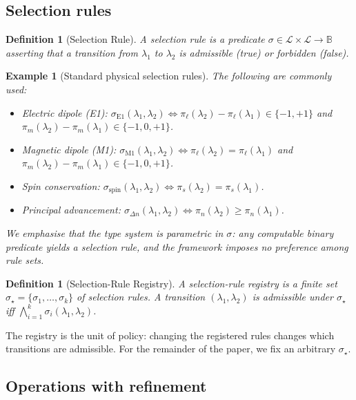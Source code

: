 \documentclass[twocolumn,11pt,a4paper]{article}
\newtheorem{definition}[theorem]{Definition}
\newtheorem{example}[theorem]{Example}
\newcommand{\Bool}{\mathbb{B}}
\newcommand{\Lab}{\mathcal{L}}
\newcommand{\Sel}{\sigma}
\begin{document}
\subsection{Selection rules}

\begin{definition}[Selection Rule]
\label{def:selection-rule}
A \emph{selection rule} is a predicate $\Sel \in \Lab \times \Lab \to \Bool$ asserting that a transition from $\lambda_1$ to $\lambda_2$ is admissible (true) or forbidden (false).
\end{definition}

\begin{example}[Standard physical selection rules]
\label{ex:physical-selection-rules}
The following are commonly used:
\begin{itemize}[nosep,leftmargin=*]
\item Electric dipole (E1): $\Sel_{\mathrm{E1}}(\lambda_1, \lambda_2) \iff \pi_\ell(\lambda_2) - \pi_\ell(\lambda_1) \in \{-1, +1\}$ and $\pi_m(\lambda_2) - \pi_m(\lambda_1) \in \{-1, 0, +1\}$.
\item Magnetic dipole (M1): $\Sel_{\mathrm{M1}}(\lambda_1, \lambda_2) \iff \pi_\ell(\lambda_2) = \pi_\ell(\lambda_1)$ and $\pi_m(\lambda_2) - \pi_m(\lambda_1) \in \{-1, 0, +1\}$.
\item Spin conservation: $\Sel_{\mathrm{spin}}(\lambda_1, \lambda_2) \iff \pi_s(\lambda_2) = \pi_s(\lambda_1)$.
\item Principal advancement: $\Sel_{\Delta n}(\lambda_1, \lambda_2) \iff \pi_n(\lambda_2) \geq \pi_n(\lambda_1)$.
\end{itemize}
We emphasise that the type system is parametric in $\Sel$: any computable binary predicate yields a selection rule, and the framework imposes no preference among rule sets.
\end{example}

\begin{definition}[Selection-Rule Registry]
\label{def:rule-registry}
A \emph{selection-rule registry} is a finite set $\Sel_\star = \{\Sel_1, \ldots, \Sel_k\}$ of selection rules. A transition $(\lambda_1, \lambda_2)$ is \emph{admissible under $\Sel_\star$} iff $\bigwedge_{i=1}^k \Sel_i(\lambda_1, \lambda_2)$.
\end{definition}

The registry is the unit of policy: changing the registered rules changes which transitions are admissible. For the remainder of the paper, we fix an arbitrary $\Sel_\star$.

\subsection{Operations with refinement}
\end{document}
